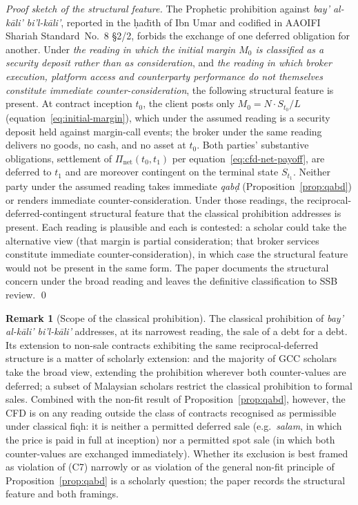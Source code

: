 \documentclass[preprint,12pt,authoryear]{elsarticle}
\theoremstyle{definition}
\newtheorem{remark}{Remark}[section]
\begin{document}
\begin{proof}[Proof sketch of the structural feature]
The Prophetic prohibition against
\emph{bay' al-k\={a}li' bi'l-k\={a}li'}, reported in the
\d{h}ad\={\i}th of Ibn Umar and codified in AAOIFI Shariah
Standard~No.~8 \S2/2, forbids the exchange of one deferred
obligation for another. Under \emph{the reading in which the
initial margin $M_0$ is classified as a security deposit rather
than as consideration}, and \emph{the reading in which broker
execution, platform access and counterparty performance do not
themselves constitute immediate counter-consideration}, the
following structural feature is present. At contract inception
$t_0$, the client posts only $M_0 = N \cdot S_{t_0} / L$
(equation~\eqref{eq:initial-margin}), which under the assumed
reading is a security deposit held against margin-call events;
the broker under the same reading delivers no goods, no cash,
and no asset at $t_0$. Both parties' substantive obligations,
settlement of $\Pi_{\text{net}}(t_0, t_1)$ per
equation~\eqref{eq:cfd-net-payoff}, are deferred to $t_1$ and
are moreover contingent on the terminal state $S_{t_1}$. Neither
party under the assumed reading takes immediate \emph{qab\d{d}}
(Proposition~\ref{prop:qabd}) or renders immediate
counter-consideration. Under those readings, the
reciprocal-deferred-contingent structural feature that the
classical prohibition addresses is present. Each reading is
plausible and each is contested: a scholar could take the
alternative view (that margin is partial consideration; that
broker services constitute immediate counter-consideration), in
which case the structural feature would not be present in the
same form. The paper documents the structural concern under the
broad reading and leaves the definitive classification to SSB
review. \qed
\end{proof}

\begin{remark}[Scope of the classical prohibition]
\label{rem:kali-scope}
The classical prohibition of \emph{bay' al-k\={a}li' bi'l-k\={a}li'}
addresses, at its narrowest reading, the sale of a debt for a debt.
Its extension to non-sale contracts exhibiting the same
reciprocal-deferred structure is a matter of scholarly extension:
\citet{Usmani2002} and the majority of GCC scholars take the broad
view, extending the prohibition wherever both counter-values are
deferred; a subset of Malaysian scholars restrict the classical
prohibition to formal sales. Combined with the non-fit result of
Proposition~\ref{prop:qabd}, however, the CFD is on any reading
outside the class of contracts recognised as permissible under
classical fiqh: it is neither a permitted deferred sale (e.g.\
\emph{salam}, in which the price is paid in full at inception) nor
a permitted spot sale (in which both counter-values are exchanged
immediately). Whether its exclusion is best framed as violation of
(C7) narrowly or as violation of the general non-fit principle of
Proposition~\ref{prop:qabd} is a scholarly question; the paper
records the structural feature and both framings.
\end{remark}
\end{document}
